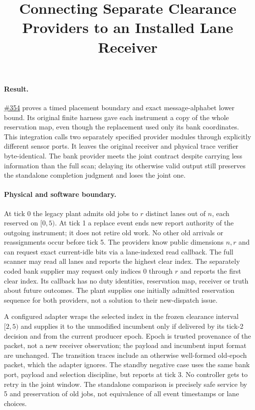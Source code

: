 \documentclass[11pt]{article}
\title{Connecting Separate Clearance Providers to an Installed Lane Receiver}
\date{}
\begin{document}
\maketitle

\paragraph{Result.}
\href{https://github.com/eternal-november/eos-research-programmes/pull/354}{\#354} proves a timed placement boundary and exact message-alphabet lower bound. Its original finite harness gave each instrument a copy of the whole reservation map, even though the replacement used only its bank coordinates. This integration calls two separately specified provider modules through explicitly different sensor ports. It leaves the original receiver and physical trace verifier byte-identical. The bank provider meets the joint contract despite carrying less information than the full scan; delaying its otherwise valid output still preserves the standalone completion judgment and loses the joint one.

\paragraph{Physical and software boundary.}
At tick 0 the legacy plant admits old jobs to $r$ distinct lanes out of $n$, each reserved on $[0,5)$. At tick 1 a replace event ends new report authority of the outgoing instrument; it does not retire old work. No other old arrivals or reassignments occur before tick 5. The providers know public dimensions $n,r$ and can request exact current-idle bits via a lane-indexed read callback. The full scanner may read all lanes and reports the highest clear index. The separately coded bank supplier may request only indices $0$ through $r$ and reports the first clear index. Its callback has no duty identities, reservation map, receiver or truth about future outcomes. The plant supplies one initially admitted reservation sequence for both providers, not a solution to their new-dispatch issue.

A configured adapter wraps the selected index in the frozen clearance interval $[2,5)$ and supplies it to the unmodified incumbent only if delivered by its tick-2 decision and from the current producer epoch. Epoch is trusted provenance of the packet, not a new receiver observation; the payload and incumbent input format are unchanged. The transition traces include an otherwise well-formed old-epoch packet, which the adapter ignores. The standby negative case uses the same bank port, payload and selection discipline, but reports at tick 3. No controller gets to retry in the joint window. The standalone comparison is precisely safe service by 5 and preservation of old jobs, not equivalence of all event timestamps or lane choices.
\end{document}
